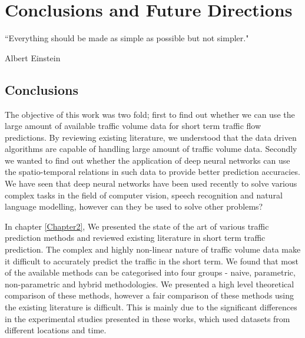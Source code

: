
\chapter{Conclusions and Future Directions} %

\label{Chapter6} %


``Everything should be made as simple as possible but not simpler."

\begin{flushright}
Albert Einstein
\end{flushright}


\section{Conclusions}

The objective of this work was two fold; first to find out whether we can use the large amount of
available traffic volume data for short term traffic flow predictions. By reviewing existing literature,
we understood that the data driven algorithms are capable of handling large amount of traffic volume
data. Secondly we wanted to find out whether the application of deep neural networks can use the
spatio-temporal relations in such data to provide better prediction accuracies. We have seen that
deep neural networks have been used recently to solve various complex tasks in the field of computer
vision, speech recognition and natural language modelling, however can they be used to solve other problems?

In chapter \ref{Chapter2}, We presented the state of the art of various traffic prediction methods
and reviewed existing literature in short term traffic prediction. The complex and highly non-linear
nature of traffic volume data make it difficult to accurately predict the traffic in the short term.
We found that most of the available methods can be categorised into four groups - naive, parametric,
non-parametric and hybrid methodologies.
We presented a high level theoretical comparison of these methods, however a fair comparison of
these methods using the existing literature is difficult. This is mainly due to the significant
differences in the experimental studies presented in these works, which used datasets from different
locations and time.


